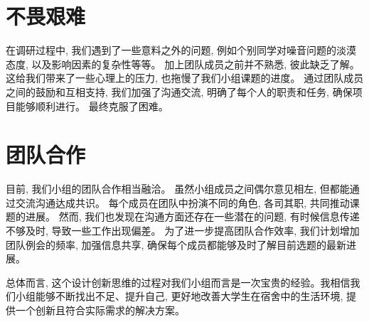 \documentclass[a4paper]{article}
\begin{document}
    \section{不畏艰难}

    {
        在调研过程中, 我们遇到了一些意料之外的问题, 
        例如个别同学对噪音问题的淡漠态度, 以及影响因素的复杂性等等。
        加上团队成员之前并不熟悉, 彼此缺乏了解。
        这给我们带来了一些心理上的压力, 也拖慢了我们小组课题的进度。
        通过团队成员之间的鼓励和互相支持, 我们加强了沟通交流, 明确了每个人的职责和任务, 确保项目能够顺利进行。
        最终克服了困难。
    }

    \section{团队合作}

    {
        目前, 我们小组的团队合作相当融洽。
        虽然小组成员之间偶尔意见相左, 但都能通过交流沟通达成共识。
        每个成员在团队中扮演不同的角色, 各司其职, 共同推动课题的进展。
        然而, 我们也发现在沟通方面还存在一些潜在的问题, 有时候信息传递不够及时, 导致一些工作出现偏差。
        为了进一步提高团队合作效率, 我们计划增加团队例会的频率, 加强信息共享, 
        确保每个成员都能够及时了解目前选题的最新进展。
    }

    {
        总体而言, 这个设计创新思维的过程对我们小组而言是一次宝贵的经验。我相信我们小组能够不断找出不足、提升自己, 更好地改善大学生在宿舍中的生活环境, 
        提供一个创新且符合实际需求的解决方案。

    }
\end{document}
